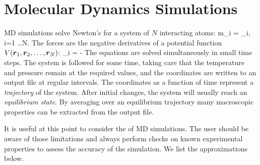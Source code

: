 \section{Molecular Dynamics Simulations}
\label{sec:MDsimulations}
MD simulations solve Newton's  
for a system of $N$ interacting atoms:
\beq
  m_i   = _i, \;i=1 \ldots N.
\eeq
The forces are the negative derivatives of a potential function $V(\mbox{\boldmath ${r}$}_1, 
\mbox{\boldmath ${r}$}_2, \ldots, \mbox{\boldmath ${r}$}_N)$:
\beq
  _i = - 
\eeq
The equations are solved simultaneously in small time steps. The
system is followed for some time, taking care that the temperature and
pressure remain at the required values, and the coordinates are
written to an output file at regular intervals. The coordinates as a
function of time represent a {\em trajectory} of the system. After
initial changes, the system will usually reach an {\em equilibrium
state}. By averaging over an equilibrium trajectory many macroscopic
properties can be extracted from the output file.

It is useful at this point to consider the  of MD
simulations. The user should be aware of those limitations and always
perform checks on known experimental properties to assess the accuracy
of the simulation. We list the approximations below.


